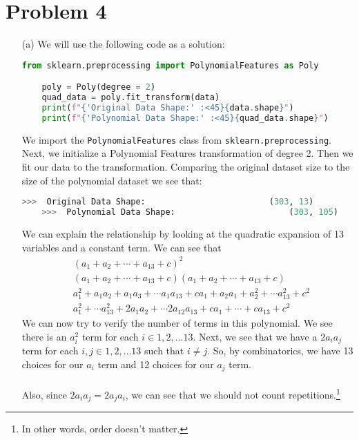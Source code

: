 \documentclass[12pt, letterpaper]{article}
\begin{document}
\newpage
\noindent\makebox[\linewidth]{\rule{18cm}{0.4pt}}
\section*{Problem 4}

\begin{enumerate}
    \item [(a)] We will use the following code as a solution: 
\begin{lstlisting}[language = python]
    from sklearn.preprocessing import PolynomialFeatures as Poly

    poly = Poly(degree = 2)
    quad_data = poly.fit_transform(data)
    print(f"{'Original Data Shape:' :<45}{data.shape}")
    print(f"{'Polynomial Data Shape:' :<45}{quad_data.shape}")
\end{lstlisting}
    We import the \texttt{PolynomialFeatures} class from \texttt{sklearn.preprocessing}. Next, we 
    initialize a Polynomial Features transformation of degree 2. Then we fit our data to the 
    transformation. Comparing the original dataset size to the size of the polynomial dataset we 
    see that:
\begin{lstlisting}[language = python]
    >>>  Original Data Shape:                         (303, 13)
    >>>  Polynomial Data Shape:                       (303, 105)
\end{lstlisting}
    We can explain the relationship by looking at the quadratic expansion of 13 variables and a constant term. We 
    can see that 
    \begin{align*}
        &(a_1 + a_2 + \cdots + a_{13} + c)^2 \\
        &(a_1 + a_2 + \cdots + a_{13} + c)(a_1 + a_2 + \cdots + a_{13} + c) \\
        &a_1^2 + a_1a_2 + a_1a_3 + \cdots a_1a_{13} + ca_1 + a_2a_1 + a_2^2 + \cdots a_{13}^2 + c^2 \\ 
        &a_1^2 + \cdots a_{13}^2 + 2a_1a_2 + \cdots 2a_{12}a_{13} + ca_1 + \cdots + ca_{13} + c^2
    \end{align*}
    We can now try to verify the number of terms in this polynomial. We see there is an $a_i^2$ term for 
    each $i\in {1,2, \dots 13}$. Next, we see that we have a $2a_ia_j$ term for each 
    $i,j \in {1,2, \dots 13}$ such that $i\ne j$. So, by combinatorics, we have 13 choices for our 
    $a_i$ term and 12 choices for our $a_j$ term. \\ \\
    Also, since $2a_ia_j = 2a_ja_i$, we can see that we should not count repetitions.\footnote[2]{ In other words, order doesn't matter.} 

\end{enumerate}
\end{document}
